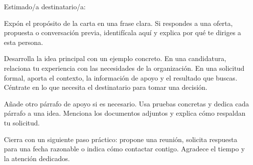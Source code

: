 {\large\bfseries\color{accent}}

Estimado/a destinatario/a:

Expón el propósito de la carta en una frase clara. Si respondes a una oferta,
propuesta o conversación previa, identifícala aquí y explica por qué te diriges
a esta persona.

Desarrolla la idea principal con un ejemplo concreto. En una candidatura,
relaciona tu experiencia con las necesidades de la organización. En una solicitud
formal, aporta el contexto, la información de apoyo y el resultado que buscas.
Céntrate en lo que necesita el destinatario para tomar una decisión.

Añade otro párrafo de apoyo si es necesario. Usa pruebas concretas y dedica
cada párrafo a una idea. Menciona los documentos adjuntos y explica cómo
respaldan tu solicitud.

Cierra con un siguiente paso práctico: propone una reunión, solicita respuesta
para una fecha razonable o indica cómo contactar contigo. Agradece el tiempo
y la atención dedicados.
